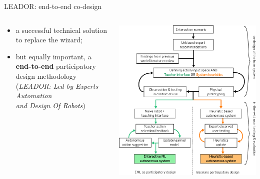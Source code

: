 \documentclass[xcolor=table,aspectratio=169]{beamer}
\begin{document}
{
\begin{frame}{LEADOR: end-to-end co-design}

    \begin{columns}
        \begin{column}{0.6\linewidth}
    \begin{itemize}
        \item a successful technical solution to replace the wizard;
        \item but equally important, a \textbf{end-to-end} participatory design
            methodology (\emph{LEADOR: Led-by-Experts Automation \\and Design Of
            Robots})
    \end{itemize}



        \end{column}
        \begin{column}{0.4\linewidth}
            \begin{center}

                \includegraphics[width=\columnwidth]{DesignProcess-full}
            \end{center}
        \end{column}
    \end{columns}

\end{frame}
}
\end{document}
